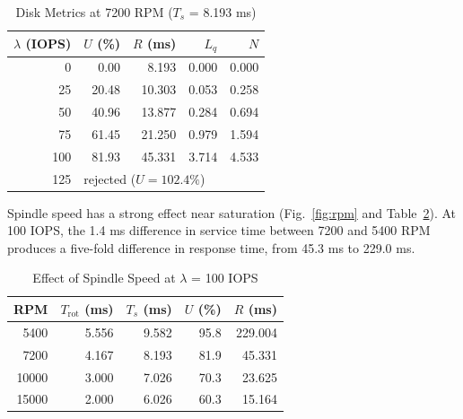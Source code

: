 \documentclass{ieeeaccess}
\begin{document}
\begin{table}[!t]
\caption{Disk Metrics at 7200 RPM ($T_s$ = 8.193 ms)}
\label{tab:disk}
\centering
\footnotesize
\begin{tabular}{rrrrr}
\toprule
$\lambda$ (IOPS) & $U$ (\%) & $R$ (ms) & $L_q$ & $N$ \\
\midrule
0 & 0.00 & 8.193 & 0.000 & 0.000 \\
25 & 20.48 & 10.303 & 0.053 & 0.258 \\
50 & 40.96 & 13.877 & 0.284 & 0.694 \\
75 & 61.45 & 21.250 & 0.979 & 1.594 \\
100 & 81.93 & 45.331 & 3.714 & 4.533 \\
125 & \multicolumn{4}{l}{rejected ($U = 102.4\%$)} \\
\bottomrule
\end{tabular}
\end{table}

Spindle speed has a strong effect near saturation (Fig.~\ref{fig:rpm} and Table~\ref{tab:rpm}). At 100 IOPS, the 1.4 ms difference in service time between 7200 and 5400 RPM produces a five-fold difference in response time, from 45.3 ms to 229.0 ms.

\begin{table}[!t]
\caption{Effect of Spindle Speed at $\lambda$ = 100 IOPS}
\label{tab:rpm}
\centering
\footnotesize
\begin{tabular}{rrrrr}
\toprule
RPM & $T_{\text{rot}}$ (ms) & $T_s$ (ms) & $U$ (\%) & $R$ (ms) \\
\midrule
5400 & 5.556 & 9.582 & 95.8 & 229.004 \\
7200 & 4.167 & 8.193 & 81.9 & 45.331 \\
10000 & 3.000 & 7.026 & 70.3 & 23.625 \\
15000 & 2.000 & 6.026 & 60.3 & 15.164 \\
\bottomrule
\end{tabular}
\end{table}
\end{document}
